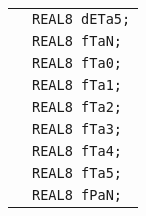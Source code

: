 \documentclass[12pt]{article}
\begin{document}
\begin{tabular}{ll}
                        & \texttt{REAL8 dETa5;}  \\
                        & \texttt{REAL8 fTaN;}  \\
                        & \texttt{REAL8 fTa0;}  \\
                        & \texttt{REAL8 fTa1;}  \\
                        & \texttt{REAL8 fTa2;}  \\
                        & \texttt{REAL8 fTa3;}  \\
                        & \texttt{REAL8 fTa4;}  \\
                        & \texttt{REAL8 fTa5;}  \\
                        & \texttt{REAL8 fPaN;}  \\
\end{tabular}
\end{document}
